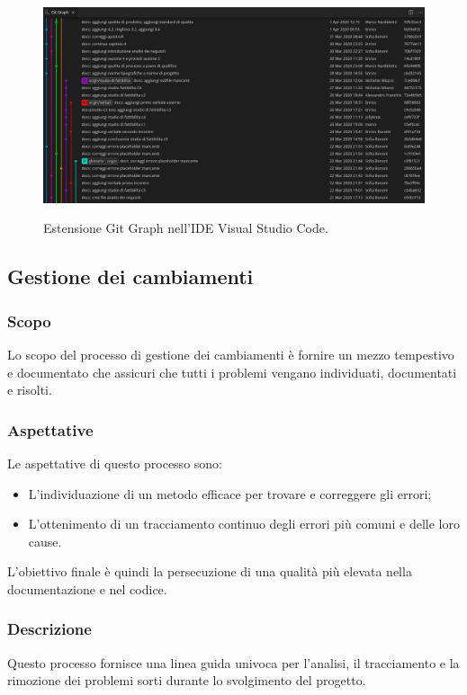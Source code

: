 \documentclass[../norme-di-progetto.tex]{subfiles}
\begin{document}
\begin{figure}[H]
  \centering
  \includegraphics[width=15cm]{img/gitgraph.png}
  \label{fig:github}
  \caption{Estensione Git Graph nell'IDE Visual Studio Code.}
\end{figure}

\subsection{Gestione dei cambiamenti}
\subsubsection{Scopo}
Lo scopo del processo di gestione dei cambiamenti è fornire un mezzo tempestivo e documentato che assicuri che tutti i problemi vengano individuati, documentati e risolti.

\subsubsection{Aspettative}
Le aspettative di questo processo sono:
\begin{itemize}
  \item L'individuazione di un metodo efficace per trovare e correggere gli errori;
  \item L'ottenimento di un tracciamento continuo degli errori più comuni e delle loro cause.
\end{itemize}
L'obiettivo finale è quindi la persecuzione di una qualità più elevata nella documentazione e nel codice.

\subsubsection{Descrizione}
Questo processo fornisce una linea guida univoca per l'analisi, il tracciamento e la rimozione dei problemi sorti durante lo svolgimento del progetto.
\end{document}

